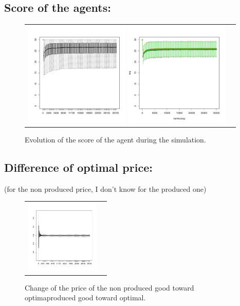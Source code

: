 \documentclass[a4paper]{article}
\begin{document}
\subsection{Score of the agents:}
\begin{figure}[htp]
    \centering
    \begin{tabular}{cc}
	\includegraphics[width=5cm]{boxScoreTime.pdf}
	\includegraphics[width=5cm]{meanEachGroup.pdf}
    \end{tabular}
    \caption{Evolution of the score of the agent during the simulation.}
\end{figure}
\subsection{Difference of optimal price:}
(for the non produced price, I don't know for the produced one)
\begin{figure}[htp]
    \centering
    \begin{tabular}{cc}
	\includegraphics[width=3.5cm]{meanRatio.pdf}
    \end{tabular}
    \caption{Change of the price of the non produced good toward optimaproduced good toward optimal.}
\end{figure}
\end{document}
